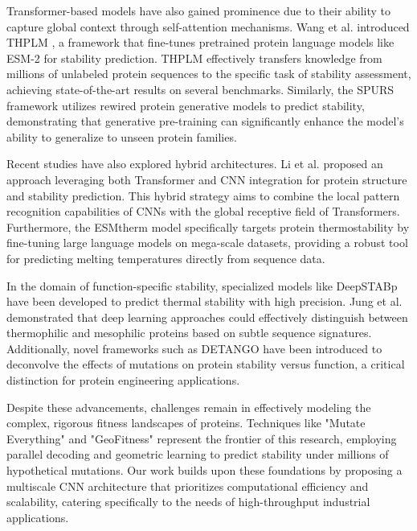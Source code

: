 \documentclass[conference]{IEEEtran}
\begin{document}
Transformer-based models have also gained prominence due to their ability to capture global context through self-attention mechanisms. Wang et al. introduced THPLM \cite{b9}, a framework that fine-tunes pretrained protein language models like ESM-2 for stability prediction. THPLM effectively transfers knowledge from millions of unlabeled protein sequences to the specific task of stability assessment, achieving state-of-the-art results on several benchmarks. Similarly, the SPURS framework \cite{b14} utilizes rewired protein generative models to predict stability, demonstrating that generative pre-training can significantly enhance the model's ability to generalize to unseen protein families.

Recent studies have also explored hybrid architectures. Li et al. \cite{b7} proposed an approach leveraging both Transformer and CNN integration for protein structure and stability prediction. This hybrid strategy aims to combine the local pattern recognition capabilities of CNNs with the global receptive field of Transformers. Furthermore, the ESMtherm model \cite{b8} specifically targets protein thermostability by fine-tuning large language models on mega-scale datasets, providing a robust tool for predicting melting temperatures directly from sequence data.

In the domain of function-specific stability, specialized models like DeepSTABp \cite{b3} have been developed to predict thermal stability with high precision. Jung et al. demonstrated that deep learning approaches could effectively distinguish between thermophilic and mesophilic proteins based on subtle sequence signatures. Additionally, novel frameworks such as DETANGO \cite{b19} have been introduced to deconvolve the effects of mutations on protein stability versus function, a critical distinction for protein engineering applications.

Despite these advancements, challenges remain in effectively modeling the complex, rigorous fitness landscapes of proteins. Techniques like "Mutate Everything" \cite{b17} and "GeoFitness" \cite{b18} represent the frontier of this research, employing parallel decoding and geometric learning to predict stability under millions of hypothetical mutations. Our work builds upon these foundations by proposing a multiscale CNN architecture that prioritizes computational efficiency and scalability, catering specifically to the needs of high-throughput industrial applications.
\end{document}
